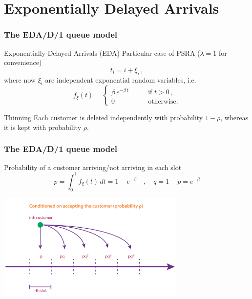 \documentclass[table,aspectratio=169]{beamer}
\begin{document}
\section{Exponentially Delayed Arrivals}

\begin{frame}[t]\frametitle{The EDA/D/1 queue model}
    \begin{block}{Exponentially Delayed Arrivals (EDA)}
        Particular case of PSRA ($\lambda = 1$ for convenience)
        \[t_i = i + \xi_i\,,\]
        where now $\xi_i$ are independent exponential random variables, i.e.\
        \[f_\xi(t) =
        \begin{cases}
            \beta\,e^{-\beta\,t} \qquad & \text{if } t>0\,,\\
            0 & \text{otherwise.}
        \end{cases}
        \]
    \end{block}
    \begin{block}{Thinning}
        Each customer is deleted independently with probability
        $1-\rho$, whereas it is kept with probability $\rho$.
    \end{block}
\end{frame}

\begin{frame}[t]\frametitle{The EDA/D/1 queue model}
    \begin{block}{Probability of a customer arriving/not arriving in each slot}
        \[p = \int_0^1 f_\xi(t)\, dt = 1-e^{-\beta} \quad,\quad q=1-p=e^{-\beta}\]
    \end{block}
    \begin{center}
        \includegraphics[width=0.7\textwidth]{eda}
    \end{center}
\end{frame}
\end{document}
